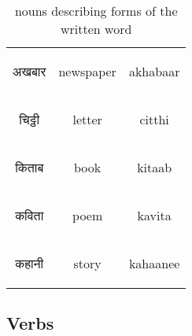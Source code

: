 \begin{table}[H]
    \centering
    \begin{tabular}{c|c|c}        
    \begin{hindi} अखबार\end{hindi} & newspaper 	& akhabaar \\
    \begin{hindi}चिट्ठी  \end{hindi} & letter 	&  citthi\\
    \begin{hindi}किताब   \end{hindi} & book 	&  kitaab\\
    \begin{hindi}कविता   \end{hindi} & poem 	&  kavita\\
    \begin{hindi}कहानी   \end{hindi} & story	&  kahaanee \\
    \end{tabular}
	\caption{nouns describing forms of the written word}
    \label{tab:nouns_literature}
\end{table}

\newpage 
\subsection{Verbs}


